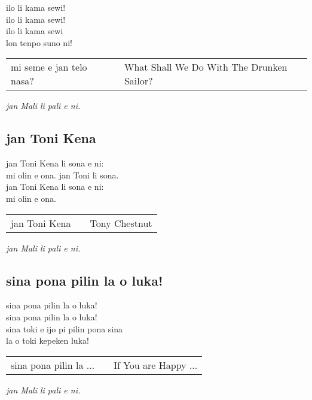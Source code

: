 ilo li kama sewi! \\
ilo li kama sewi! \\
ilo li kama sewi \\
lon tenpo suno ni!

\begin{supertabular}{p{5,5cm}|ll}
    mi seme e jan telo nasa? &  & What Shall We Do With The Drunken Sailor? \\
\end{supertabular}

\textit{jan Mali li pali e ni. \cite{www:astrodonunt:01}}

\subsection{jan Toni Kena}

jan Toni Kena li sona e ni:  \\
mi olin e ona. jan Toni li sona.  \\
jan Toni Kena li sona e ni: \\
mi olin e ona.

\begin{supertabular}{p{5,5cm}|ll}
    jan Toni Kena &  & Tony Chestnut \\
\end{supertabular}

\textit{jan Mali li pali e ni. \cite{www:astrodonunt:01}}

\subsection{sina pona pilin la o luka!}

sina pona pilin la o luka!  \\
sina pona pilin la o luka!  \\
sina toki e ijo pi pilin pona sina  \\
la o toki kepeken luka!

\begin{supertabular}{p{5,5cm}|ll}
    sina pona pilin la ... &  & If You are Happy ... \\
\end{supertabular}

\textit{jan Mali li pali e ni. \cite{www:astrodonunt:01}}

